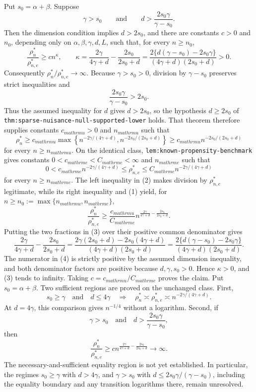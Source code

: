 Put \(s_0=\alpha+\beta\).  Suppose
\[
 \gamma>s_0
 \qquad\text{and}\qquad
 d>\frac{2s_0\gamma}{\gamma-s_0}.
\]
Then the dimension condition implies \(d>2s_0\), and there are constants \(c>0\) and \(n_0\), depending only on \(\alpha,\beta,\gamma,d,L\), such that, for every \(n\ge n_0\),
\[
 \frac{\rho_n^*}{\rho_{n,e}^*}
 \ge c n^{\kappa},
 \qquad
 \kappa=
 \frac{2\gamma}{4\gamma+d}
 -\frac{2s_0}{2s_0+d}
 =\frac{2\{d(\gamma-s_0)-2s_0\gamma\}}
 {(4\gamma+d)(2s_0+d)}>0.
\]
Consequently \(\rho_n^*/\rho_{n,e}^*\to\infty\).
Because \(\gamma>s_0>0\), division by \(\gamma-s_0\) preserves strict inequalities and
\[
 \frac{2s_0\gamma}{\gamma-s_0}>2s_0.
\]
Thus the assumed inequality for \(d\) gives \(d>2s_0\), so the hypothesis \(d\ge 2s_0\) of \texttt{thm:sparse-nuisance-null-supported-lower} holds.  That theorem therefore supplies constants \(c_{mathrm u}>0\) and \(n_{mathrm u}\) such that
\[
 \rho_n^*
 \ge c_{mathrm u}
 \max\left\{n^{-2\gamma/(4\gamma+d)},
 n^{-2s_0/(2s_0+d)}\right\}
 \ge c_{mathrm u}n^{-2s_0/(2s_0+d)}
 \tag{1}
\]
for every \(n\ge n_{mathrm u}\).  On the identical class, \texttt{lem:known-propensity-benchmark} gives constants \(0<c_{mathrm e}<C_{mathrm e}<\infty\) and \(n_{mathrm e}\) such that
\[
 0<c_{mathrm e}n^{-2\gamma/(4\gamma+d)}
 \le \rho_{n,e}^*
 \le C_{mathrm e}n^{-2\gamma/(4\gamma+d)}
 \tag{2}
\]
for every \(n\ge n_{mathrm e}\).  The left inequality in (2) makes division by \(\rho_{n,e}^*\) legitimate, while its right inequality and (1) yield, for \(n\ge n_0:=\max\{n_{mathrm u},n_{mathrm e}\}\),
\[
 \frac{\rho_n^*}{\rho_{n,e}^*}
 \ge \frac{c_{mathrm u}}{C_{mathrm e}}
 n^{\frac{2\gamma}{4\gamma+d}-\frac{2s_0}{2s_0+d}}.
 \tag{3}
\]
Putting the two fractions in (3) over their positive common denominator gives
\[
 \frac{2\gamma}{4\gamma+d}-\frac{2s_0}{2s_0+d}
 =\frac{2\gamma(2s_0+d)-2s_0(4\gamma+d)}
 {(4\gamma+d)(2s_0+d)}
 =\frac{2\{d(\gamma-s_0)-2s_0\gamma\}}
 {(4\gamma+d)(2s_0+d)}.
 \tag{4}
\]
The numerator in (4) is strictly positive by the assumed dimension inequality, and both denominator factors are positive because \(d,\gamma,s_0>0\).  Hence \(\kappa>0\), and (3) tends to infinity.  Taking \(c=c_{mathrm u}/C_{mathrm e}\) proves the claim.
Put \(s_0=\alpha+\beta\).  Two sufficient regions are proved on the unchanged class.  First,
\[
 s_0\ge\gamma\quad\text{and}\quad d\le4\gamma
 \quad\Longrightarrow\quad
 \rho_n^*\asymp\rho_{n,e}^*\asymp n^{-2\gamma/(4\gamma+d)}.
\]
At \(d=4\gamma\), this comparison gives \(n^{-1/4}\) without a logarithm.  Second, if
\[
 \gamma>s_0
 \quad\text{and}\quad
 d>\frac{2s_0\gamma}{\gamma-s_0},
\]
then
\[
 \frac{\rho_n^*}{\rho_{n,e}^*}
 \ge c n^{\frac{2\gamma}{4\gamma+d}-\frac{2s_0}{2s_0+d}}
 \longrightarrow\infty.
\]
The necessary-and-sufficient equality region is not yet established.  In particular, the regimes \(s_0\ge\gamma\) with \(d>4\gamma\), and \(\gamma>s_0\) with \(d\le 2s_0\gamma/(\gamma-s_0)\), including the equality boundary and any transition logarithms there, remain unresolved.
